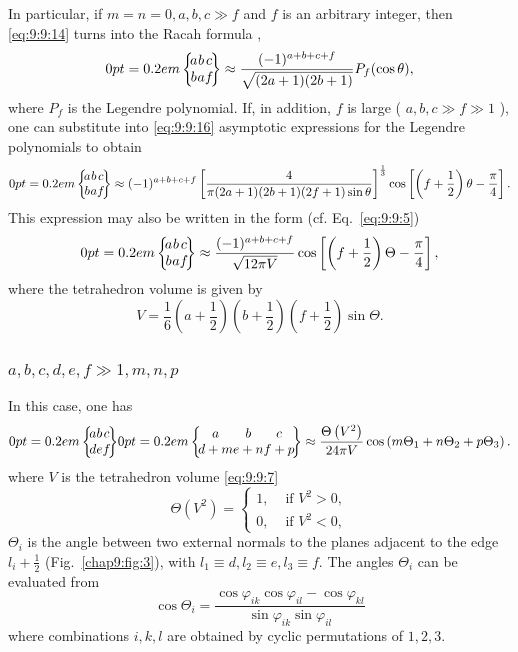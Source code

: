 In particular, if $m=n=0, a, b, c \gg f$ and $f$ is an arbitrary integer, then \eqref{eq:9:9:14} turns into the Racah formula \cite{ref093},
\begin{equation}
\sixj{a}{b}{c}{b}{a}{f}  \label{eq:9:9:16} \approx \frac{(-1)^{a+b+c+f}}{\sqrt{(2 a+1)(2 b+1)}} P_{f}(\cos \theta),
\end{equation}
where $P_{f}$ is the Legendre polynomial. If, in addition, $f$ is large ( $a, b, c \gg f \gg 1$ ), one can substitute into \eqref{eq:9:9:16} asymptotic expressions for the Legendre polynomials to obtain
\begin{equation}
\sixj{a}{b}{c}{b}{a}{f}  \label{eq:9:9:17} \approx(-1)^{a+b+c+f}\left[\frac{4}{\pi(2 a+1)(2 b+1)(2 f+1) \sin \theta}\right]^{\frac{1}{3}} \cos \left[\left(f+\frac{1}{2}\right) \theta-\frac{\pi}{4}\right] .
\end{equation}
This expression may also be written in the form (cf. Eq.~\eqref{eq:9:9:5})
\begin{equation}
\sixj{a}{b}{c}{b}{a}{f}  \label{eq:9:9:18} \approx \frac{(-1)^{a+b+c+f}}{\sqrt{12 \pi V}} \cos \left[\left(f+\frac{1}{2}\right) \Theta-\frac{\pi}{4}\right],
\end{equation}
where the tetrahedron volume is given by
\begin{equation}
V=\frac{1}{6}\left(a+\frac{1}{2}\right)\left(b+\frac{1}{2}\right)\left(f+\frac{1}{2}\right) \sin \Theta . \label{eq:9:9:19}
\end{equation}
\subsubsection{$a, b, c, d, e, f \gg 1, m, n, p$}In this case,  one has
\begin{equation}
\sixj{a}{b}{c}{d}{e}{f}  \label{eq:9:9:20}\sixj{a}{b}{c}{d+m}{e+n}{f+p} \approx \frac{\Theta\left(V^{2}\right)}{24 \pi V} \cos \left(m \Theta_{1}+n \Theta_{2}+p \Theta_{3}\right) .
\end{equation}
where $V$ is the tetrahedron volume \eqref{eq:9:9:7}
\begin{equation}
\Theta\left(V^{2}\right)= \begin{cases}1, & \text { if } V^{2}>0,  \label{eq:9:9:21}\\ 0, & \text { if } V^{2}<0,\end{cases}
\end{equation}
$\Theta_{i}$ is the angle between two external normals to the planes adjacent to the edge $l_{i}+\frac{1}{2}$ (Fig.~\ref{chap9:fig:3}), with $l_{1} \equiv d, l_{2} \equiv e, l_{3} \equiv f$. The angles $\Theta_{i}$ can be evaluated from
\begin{equation}
\cos \Theta_{i}=\frac{\cos \varphi_{i k} \cos \varphi_{i l}-\cos \varphi_{k l}}{\sin \varphi_{i k} \sin \varphi_{i l}} \label{eq:9:9:22}
\end{equation}
where combinations $i, k, l$ are obtained by cyclic permutations of $1,2,3$.

